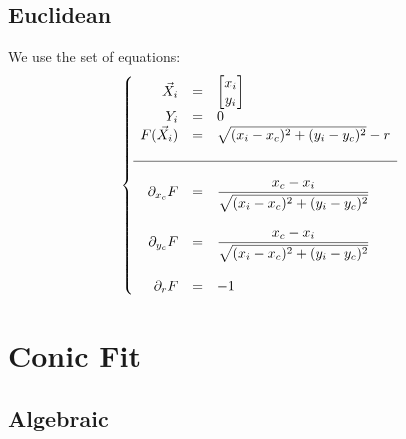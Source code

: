 \documentclass[aps,12pt]{revtex4}
\begin{document}
\subsection{Euclidean}
We use the set of equations:
\begin{equation}
\left\lbrace
\begin{array}{rcl}
\vec{X}_i & = &\begin{bmatrix} x_i\\ y_i \\ \end{bmatrix}\\
 Y_i & = & 0\\
 F(\vec{X}_i) & = & \sqrt{ (x_i-x_c)^2 + (y_i-y_c)^2} - r\\
 \\
 \hline
 \\
 \partial_{x_c} F & = & \dfrac{x_c-x_i}{\sqrt{ (x_i-x_c)^2 + (y_i-y_c)^2}}\\
 \\
  \partial_{y_c} F & = & \dfrac{x_c-x_i}{\sqrt{ (x_i-x_c)^2 + (y_i-y_c)^2}}\\
  \\
 \partial_{r} F & = & -1\\
\end{array}
\right.
\end{equation}

\section{Conic Fit}
\subsection{Algebraic}
\end{document}
